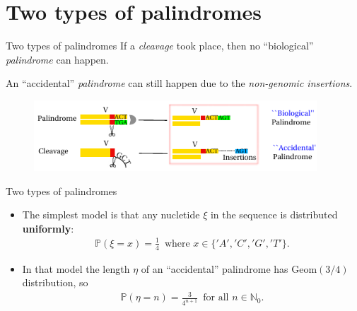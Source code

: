 \documentclass{beamer}\usepackage[]{graphicx}\usepackage[]{color}
\begin{document}
\section{Two types of palindromes}
\begin{frame}{Two types of palindromes}
  If a \textit{cleavage} took place, then no {\color{blue} ``biological''} \textit{palindrome} can happen. 
  
  \vspace{1mm}
  An {\color{blue} ``accidental''} \textit{palindrome} can still happen due to the \textit{non-genomic insertions}.
  
 \begin{figure}[h]
   \includegraphics[width=300pt]{Pictures/two_types_palindromes.pdf}
 \end{figure}
\end{frame}

\begin{frame}{Two types of palindromes}
  \begin{itemize}
    \item The simplest model is that any nucletide $\xi$ in the sequence is distributed \textbf{uniformly}:
    \begin{gather*}
      \mathbb P(\xi = x) = \frac{1}{4} \, \mbox{ where } x \in \{'A', 'C', 'G','T'\}.
    \end{gather*}
    \item In that model the length $\eta$ of an ``accidental'' palindrome has $\mathrm{Geom}(3/4)$ distribution, so
    \begin{gather*}
      \mathbb P(\eta = n) = \frac{3}{4^{n+1}} \, \mbox { for all } n \in \mathbb N_0.
    \end{gather*}
  \end{itemize}
\end{frame}
\end{document}
